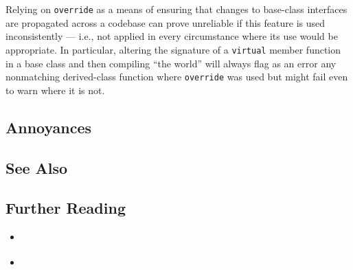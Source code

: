 Relying on \lstinline!override! as a means of ensuring that changes to
base-class interfaces are propagated across a codebase can prove
unreliable if this feature is used inconsistently --- i.e., not applied in every circumstance where its use would be appropriate. In
particular, altering the signature of a \lstinline!virtual! member function
in a base class and then compiling ``the world'' will always flag as an
error any nonmatching derived-class function where \lstinline!override!
was used but might fail even to warn where it is not.

\subsection[Annoyances]{Annoyances}\label{annoyances}

\hspace*{\fill}

\subsection[See Also]{See Also}\label{see-also}

\hspace*{\fill}

\subsection[Further Reading]{Further Reading}\label{further-reading}

\begin{itemize}
\item{\cite{meyers15b}}
\item{\cite{fluentcpp}}
\end{itemize}


